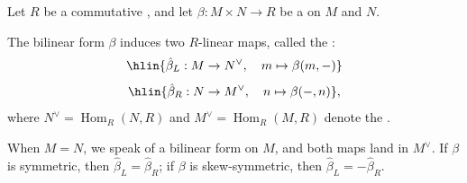 \begin{definition} \label{definition:adjoint_maps_of_a_bilinear_form_on_modules_over_a_commutative_ring}
    Let $R$ be a commutative , and let $\beta: M \times N \to R$ be a  on  $M$ and $N$.

    The bilinear form $\beta$ induces two $R$-linear maps, called the :
    $$\hlin{\hat{\beta}_L: M \to N^\vee, \quad m \mapsto \beta(m, -)}$$
    $$\hlin{\hat{\beta}_R: N \to M^\vee, \quad n \mapsto \beta(-, n)},$$
    where $N^\vee = \operatorname{Hom}_R(N, R)$ and $M^\vee = \operatorname{Hom}_R(M, R)$ denote the .

    When $M = N$, we speak of a bilinear form on $M$, and both maps land in $M^\vee$. If $\beta$ is symmetric, then $\hat{\beta}_L = \hat{\beta}_R$; if $\beta$ is skew-symmetric, then $\hat{\beta}_L = -\hat{\beta}_R$.
\end{definition}
